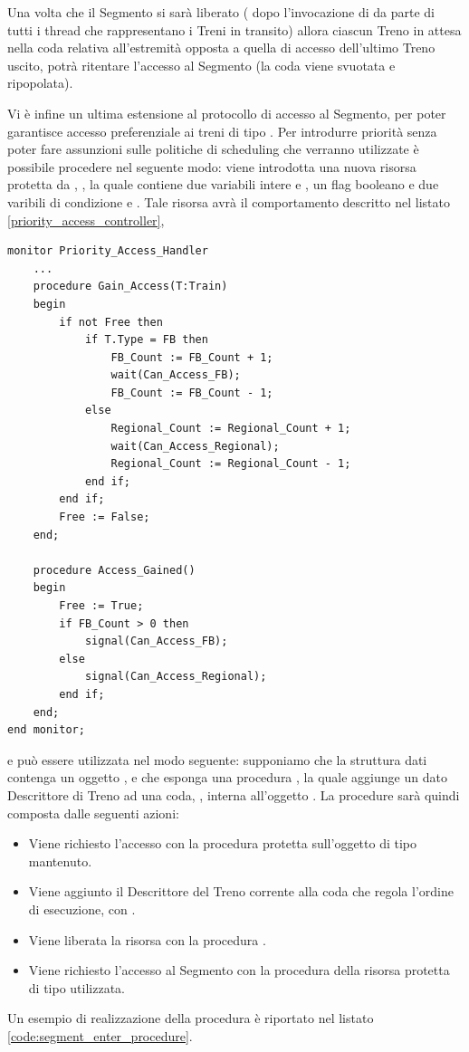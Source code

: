 \begin{description}
			Una volta che il Segmento si sarà liberato ( dopo l'invocazione di  da parte di tutti i thread che rappresentano i Treni in transito) allora ciascun Treno in attesa nella coda relativa all'estremità opposta a quella di accesso dell'ultimo Treno uscito, potrà ritentare l'accesso al Segmento (la coda viene svuotata e ripopolata).
			
			Vi è infine un ultima estensione al protocollo di accesso al Segmento, per poter garantisce accesso preferenziale ai treni di tipo . Per introdurre priorità senza poter fare assunzioni sulle politiche di scheduling che verranno utilizzate è possibile procedere nel seguente modo: viene introdotta una nuova risorsa protetta da , , la quale contiene due variabili intere  e , un flag booleano  e due varibili di condizione  e . Tale risorsa avrà il comportamento descritto nel listato \ref{priority_access_controller},
	
\begin{lstlisting}[caption=\small{monitor utilizzato per garantire accesso preferenziale a Treni di tipo \ttt{FB}.}, label=priority_access_controller]
monitor Priority_Access_Handler 
	...
	procedure Gain_Access(T:Train) 
	begin
		if not Free then
			if T.Type = FB then
				FB_Count := FB_Count + 1;
				wait(Can_Access_FB);
				FB_Count := FB_Count - 1;
			else
				Regional_Count := Regional_Count + 1;
				wait(Can_Access_Regional);
				Regional_Count := Regional_Count - 1;
			end if;
		end if;
		Free := False;
	end;
	
	procedure Access_Gained()
	begin
		Free := True;
		if FB_Count > 0 then
			signal(Can_Access_FB);
		else
			signal(Can_Access_Regional);
		end if;
	end;
end monitor;
\end{lstlisting}
			
			e può essere utilizzata nel modo seguente: supponiamo che la struttura dati  contenga un oggetto , e che esponga una procedura , la quale aggiunge un dato Descrittore di Treno ad una coda, , interna all'oggetto . La procedure  sarà quindi composta dalle seguenti azioni:
			\begin{itemize}
				\item Viene richiesto l'accesso con la procedura protetta  sull'oggetto di tipo  mantenuto.
				\item Viene aggiunto il Descrittore del Treno corrente alla coda che regola l'ordine di esecuzione, con .
				\item Viene liberata la risorsa  con la procedura .
				\item Viene richiesto l'accesso al Segmento con la procedura  della risorsa protetta di tipo  utilizzata.
			\end{itemize}
		Un esempio di realizzazione della procedura  è riportato nel listato \ref{code:segment_enter_procedure}. 
			

\end{description}
